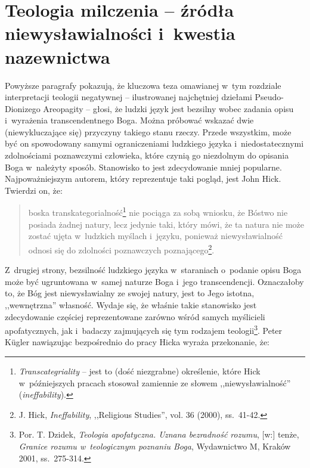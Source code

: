 \section{Teologia milczenia -- źródła niewysławialności i~kwestia nazewnictwa}\label{sil-int-nazw}

Powyższe paragrafy pokazują, że kluczowa teza omawianej w~tym rozdziale interpretacji teologii negatywnej -- ilustrowanej najchętniej dziełami Pseudo-Dionizego Areopagity -- głosi, że ludzki język jest bezsilny wobec zadania opisu i~wyrażenia transcendentnego Boga. Można próbować wskazać dwie (niewykluczające się) przyczyny takiego stanu rzeczy. Przede wszystkim, może być on spowodowany samymi ograniczeniami ludzkiego języka i~niedostatecznymi zdolnościami poznawczymi człowieka, które czynią go niezdolnym do opisania Boga w~należyty sposób. Stanowisko to jest zdecydowanie mniej popularne. Najpoważniejszym autorem, który reprezentuje taki pogląd, jest John Hick. Twierdzi on, że:

\begin{quote}
boska transkategorialność\footnote{\textit{Transcategriality} -- jest to (dość niezgrabne) określenie, które Hick w~późniejszych pracach stosował zamiennie ze słowem ,,niewysławialność'' (\textit{ineffability}).} nie pociąga za sobą wniosku, że Bóstwo nie posiada żadnej natury, lecz jedynie taki, który mówi, że ta natura nie może zostać ujęta w~ludzkich myślach i~języku, ponieważ niewysławialność odnosi się do zdolności poznawczych poznającego\footnote{J. Hick, \textit{Ineffability}, ,,Religious Studies'', vol. 36 (2000), ss.~41-42.}.
\end{quote}

Z~drugiej strony, bezsilność ludzkiego języka w~staraniach o~podanie opisu Boga może być ugruntowana w~samej naturze Boga i~jego transcendencji. Oznaczałoby to, że Bóg jest niewysławialny ze swojej natury, jest to Jego istotna, ,,wewnętrzna'' własność. Wydaje się, że właśnie takie stanowisko jest zdecydowanie częściej reprezentowane zarówno wśród samych myślicieli apofatycznych, jak i~badaczy zajmujących się tym rodzajem teologii\footnote{Por. T. Dzidek, \textit{Teologia apofatyczna. Uznana bezradność rozumu}, [w:] tenże, \textit{Granice rozumu w~teologicznym poznaniu Boga}, Wydawnictwo M, Kraków 2001, ss.~275-314.}. Peter Kügler nawiązując bezpośrednio do pracy Hicka wyraża przekonanie, że:

